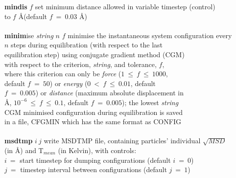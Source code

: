 \begin{tabbing}
\> {\bf mindis} $f$                             \> set minimum distance allowed in variable timestep (control) \\
\>                                              \> to $f$ \AA (default $f~=~0.03$ \AA) \\
\>                                              \> \\
\> {\bf minim}ise {\em string} $n$ $f$          \> minimise the instantaneous system configuration every \\
\>                                              \> $n$ steps during equilibration (with respect to the last \\
\>                                              \> equilibration step) using conjugate gradient method (CGM) \\
\>                                              \> with respect to the criterion, {\em string}, and tolerance, $f$, \\
\>                                              \> where this criterion can only be {\em force} ($1~\le~f~\le~1000$, \\
\>                                              \> default $f~=~50$) or {\em energy} ($0~<~f~\le~0.01$, default \\
\>                                              \> $f~=~0.005$) or {\em distance} (maximum absolute displacement in \\
\>                                              \> \AA, $10^{-6}~\le~f~\le~0.1$, default $f~=~0.005$); the lowest {\em string} \\
\>                                              \> CGM minimised configuration during equilibration is saved \\
\>                                              \> in a file, CFGMIN which has the same format as CONFIG \\
\>                                              \> \\
\> {\bf msdtmp} $i~j$                           \> write MSDTMP file, containing particles' individual $\sqrt{MSD}$ \\
\>                                              \> (in \AA) and T$_{mean}$ (in Kelvin), with controls: \\
\>                                              \> $i~=$ start timestep for dumping configurations (default $i~=~0$) \\
\>                                              \> $j~=$ timestep interval between configurations (default $j~=~1$) \\

\end{tabbing}
